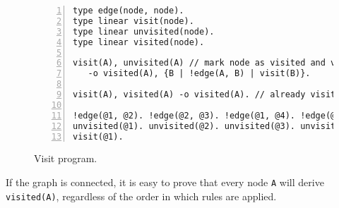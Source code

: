 {\footnotesize
\begin{figure}[h!]
\begin{Verbatim}[numbers=left]
type edge(node, node).
type linear visit(node).
type linear unvisited(node).
type linear visited(node).

visit(A), unvisited(A) // mark node as visited and visit neighbors
   -o visited(A), {B | !edge(A, B) | visit(B)}.

visit(A), visited(A) -o visited(A). // already visited

!edge(@1, @2). !edge(@2, @3). !edge(@1, @4). !edge(@2, @4).
unvisited(@1). unvisited(@2). unvisited(@3). unvisited(@4).
visit(@1).
\end{Verbatim}
  \caption{Visit program.}
  \label{code:visit}
\end{figure}}

If the graph is connected, it is easy to prove that every node \texttt{A} will derive \texttt{visited(A)},
regardless of the order in which rules are applied.
